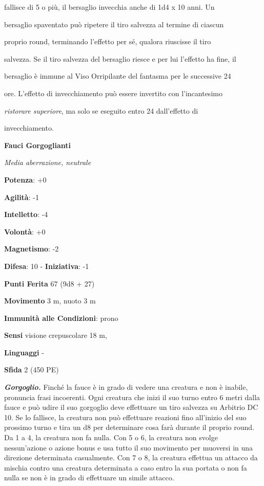 \begin{multicols}{2}
fallisce di 5 o più, il bersaglio invecchia anche di 1d4 x 10 anni. Un

bersaglio spaventato può ripetere il tiro salvezza al termine di ciascun

proprio round, terminando l'effetto per sé, qualora riuscisse il tiro

salvezza. Se il tiro salvezza del bersaglio riesce e per lui l'effetto
ha fine, il

bersaglio è immune al Viso Orripilante del fantasma per le successive 24

ore. L'effetto di invecchiamento può essere invertito con l'incantesimo

\emph{ristorare superiore}, ma solo se eseguito entro 24 dall'effetto di

invecchiamento.

\textbf{Fauci Gorgoglianti}

\emph{Media aberrazione, neutrale}

\textbf{Potenza}: +0

\textbf{Agilità}: -1

\textbf{Intelletto}: -4

\textbf{Volontà}: +0

\textbf{Magnetismo}: -2

\textbf{Difesa}: 10 - \textbf{Iniziativa}: -1

\textbf{Punti Ferita} 67 (9d8 + 27)

\textbf{Movimento} 3 m, nuoto 3 m

\textbf{Immunità alle Condizioni}: prono

\textbf{Sensi} visione crepuscolare 18 m, 

\textbf{Linguaggi} -

\textbf{Sfida} 2 (450 PE)\smallskip

\emph{\textbf{Gorgoglio.}} Finché la fauce è in grado di vedere una
creatura e non è inabile, pronuncia frasi incoerenti. Ogni creatura che
inizi il suo turno entro 6 metri dalla fauce e può udire il suo
gorgoglio deve effettuare un tiro salvezza su Arbitrio DC 10. Se lo
fallisce, la creatura non può effettuare reazioni fino all'inizio del
suo prossimo turno e tira un d8 per determinare cosa farà durante il
proprio round. Da 1 a 4, la creatura non fa nulla. Con 5 o 6, la
creatura non svolge nessun'azione o azione bonus e usa tutto il suo
movimento per muoversi in una direzione determinata casualmente. Con 7 o
8, la creatura effettua un attacco da mischia contro una creatura
determinata a caso entro la sua portata o non fa nulla se non è in grado
di effettuare un simile attacco.


\end{multicols}

